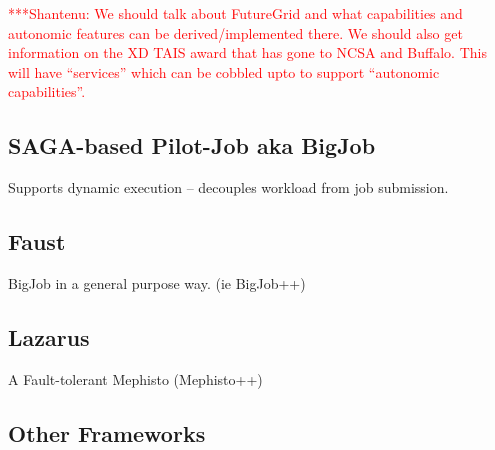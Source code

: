 \documentclass[a4paper,10pt]{article}
\newcommand{\jhanote}[1]{  {\textcolor{red}     { ***Shantenu: #1 }}}
\newcommand{\jhanote}[1]{}
\begin{document}
\jhanote{We should talk about FutureGrid and what capabilities and
  autonomic features can be derived/implemented there. We should also
  get information on the XD TAIS award that has gone to NCSA and
  Buffalo. This will have ``services'' which can be cobbled upto to
  support ``autonomic capabilities''.}

\subsection{SAGA-based Pilot-Job aka BigJob}

Supports dynamic execution -- decouples workload from job submission.

\subsection{Faust}

BigJob in a general purpose way. (ie BigJob++)

\subsection{Lazarus}

A Fault-tolerant Mephisto (Mephisto++)

\subsection{Other Frameworks}


  
 
\end{document}
